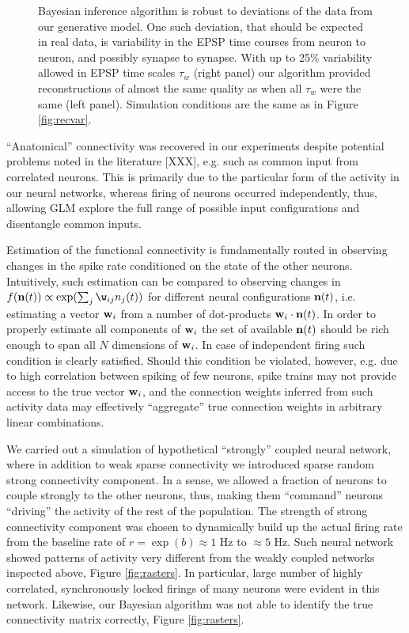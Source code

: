 \begin{figure}[h]
\begin{minipage}[c]{0.45\hsize}
\end{minipage}
\caption{Bayesian inference algorithm is robust to deviations of the
data from our generative model. One such deviation, that should be expected in real data, is variability in the EPSP time courses from neuron to neuron, and possibly synapse to synapse.
With up to 25\% variability allowed in EPSP time scales $\tau_w$ (right panel) our algorithm provided reconstructions of almost the same quality as when all $\tau_w$ were the same (left panel). Simulation conditions are the same as in Figure \ref{fig:recvar}.}
\label{fig:vartau}
\end{figure}


``Anatomical'' connectivity was recovered in our experiments despite potential problems noted in the literature [XXX], e.g. such as common input from correlated neurons. This is primarily due to the particular form of the activity in our neural networks, whereas firing of neurons occurred independently, thus, allowing GLM explore the full range of possible input configurations and disentangle common inputs.

Estimation of the functional connectivity is fundamentally routed in observing changes in the spike rate conditioned on the state of the other neurons. Intuitively, such estimation can be compared to observing changes in $f({\bf n}(t))\propto\exp(\sum_j \w_{ij}n_j(t))$ for different neural configurations ${\bf n}(t)$, i.e. estimating a vector ${\bf w}_i$ from a number of dot-products ${\bf w}_i\cdot {\bf n}(t)$. In order to properly estimate all components of ${\bf w}_i$ the set of available ${\bf n}(t)$ should be rich enough to span all $N$ dimensions of ${\bf w}_i$. In case of independent firing such condition is clearly satisfied.  Should this condition be violated, however, e.g. due to high correlation between spiking of few neurons, spike trains may not provide access to the true vector ${\bf w}_i$, and the connection weights inferred from such activity data may effectively ``aggregate'' true connection weights in arbitrary linear combinations.

We carried out a simulation of hypothetical ``strongly'' coupled  neural network, where in addition to weak sparse connectivity we introduced sparse random strong connectivity component. In a sense, we allowed a fraction of neurons to couple strongly to the other neurons, thus, making them ``command'' neurons ``driving'' the activity of the rest of the population. The strength of strong connectivity component was chosen to dynamically build up the actual firing rate from the baseline rate of $r=\exp(b)\approx 1$ Hz to $\approx 5$  Hz.
Such neural network showed patterns of activity very different from the weakly coupled networks inspected above, Figure \ref{fig:rasters}.  In particular, large number of highly correlated, synchronously locked firings of many neurons were evident in this network.  Likewise, our Bayesian algorithm was not able to identify the true connectivity matrix correctly, Figure \ref{fig:rasters}.

